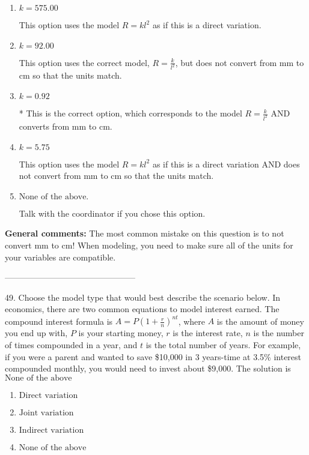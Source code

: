 \documentclass{extbook}[14pt]
\begin{document}
\begin{enumerate}[label=\Alph*.] 
\item $ k = 575.00 $ 

 This option uses the model $R = kl^{2}$ as if this is a direct variation. 
\item $ k = 92.00 $ 

 This option uses the correct model, $R = \frac{k}{l^{2}}$, but does not convert from mm to cm so that the units match. 
\item $ k = 0.92 $ 

 * This is the correct option, which corresponds to the model $R = \frac{k}{l^{2}}$ AND converts from mm to cm. 
\item $ k = 5.75 $ 

 This option uses the model $R = kl^{2}$ as if this is a direct variation AND does not convert from mm to cm so that the units match. 
\item $ \text{None of the above.} $ 

 Talk with the coordinator if you chose this option. 
\end{enumerate} 
 
\textbf{General comments:} The most common mistake on this question is to not convert mm to cm! When modeling, you need to make sure all of the units for your variables are compatible.

-----------------------------------------------

49. Choose the model type that would best describe the scenario below.
In economics, there are two common equations to model interest earned. The compound interest formula is $A = P (1 + \frac{r}{n})^{nt}$, where $A$ is the amount of money you end up with, $P$ is your starting money, $r$ is the interest rate, $n$ is the number of times compounded in a year, and $t$ is the total number of years. For example, if you were a parent and wanted to save \$10,000 in 3 years-time at 3.5\% interest compounded monthly, you would need to invest about \$9,000. 
The solution is $ \text{None of the above} $ 

\begin{enumerate}[label=\Alph*.] 
\item $ \text{Direct variation} $ 

  
\item $ \text{Joint variation} $ 

  
\item $ \text{Indirect variation} $ 

  
\item $ \text{None of the above} $ 

  
\end{enumerate} 
 
\end{document}
